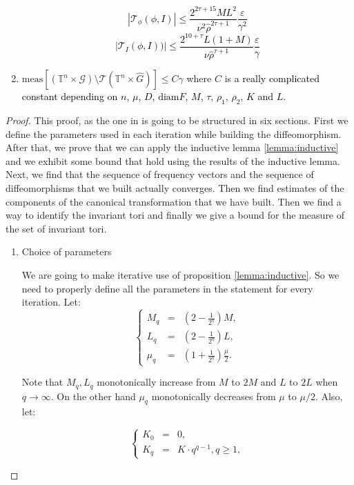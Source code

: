 \begin{theoremB}
\begin{enumerate}
\textcolor{black}{
$$|\mathcal{T}_\phi(\phi,I)| \leq \frac{2^{2\tau + 15} M L^2}{\nu^2 \hat \rho^{2\tau+1}}\frac{\varepsilon}{\gamma^2}$$
$$|\mathcal{T}_I(\phi,I))| \leq \frac{2^{10+\tau} L (1+M)}{\nu \hat \rho^{\tau+1}}\frac{\varepsilon}{\gamma}$$
}


\item\label{kam:point3} $\text{meas} [(\mathbb{T}^n\times \mathcal{G})\setminus\mathcal{T}(\mathbb{T}^n\times \hat G)] \leq C \gamma$ where $C$ is
\textcolor{black}{a really complicated constant depending on $n$,  $\mu$,  $D$,  $\text{diam} F$,  $M$, $\tau$, $\rho_1$, $\rho_2$, $K$ and $L$.}

\end{enumerate}

\end{theoremB}

\begin{proof}
This proof, as the one in \cite{D} is going to be structured in six sections. First we define the parameters used in each iteration while building the diffeomorphism. After that, we prove that we can apply the inductive lemma \ref{lemma:inductive} and we exhibit some bound that hold using the results of the inductive lemma. Next, we find that the sequence of frequency vectors and the sequence of diffeomorphisms that we built actually converges. Then we find estimates of the components of the canonical transformation that we have built. Then we find a way to identify the invariant tori and finally we give a bound for the measure of the set of invariant tori.
\begin{enumerate}
\item Choice of parameters

We are going to make iterative use of proposition \ref{lemma:inductive}. So we need to properly define all the parameters in the statement for every iteration.
Let:
$$
\left\{
\begin{array}{rcl}
M_q & = & (2 - \frac{1}{2^q})M, \\
L_q & = & (2 - \frac{1}{2^q})L, \\
\mu_q & = & (1 + \frac{1}{2^q})\frac{\mu}{2}.
\end{array}
\right.
$$

Note that $M_q, L_q$ monotonically increase from $M$ to $2M$ and $L$ to $2L$ when $q\rightarrow\infty$. On the other hand $\mu_q$ monotonically decreases from $\mu$ to $\mu/2$.
Also, let:

$$
\left\{
\begin{array}{rcl}
K_0 & = & 0, \\
K_q & = & K\cdot q^{q-1}, q \geq 1,
\end{array}
\right.
$$


\end{enumerate}
\end{proof}
